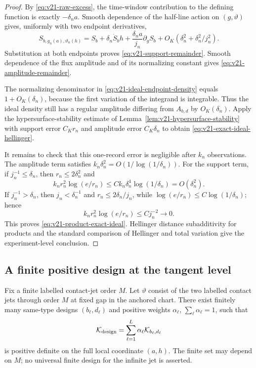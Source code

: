 \begin{proof}
By \eqref{eq:v21-raw-excess}, the time-window contribution to the defining
function is exactly $-\delta_na$.  Smooth dependence of the half-line action
on $(g,\vartheta)$ gives, uniformly with two endpoint derivatives,
\[
 S_{b,g_n(a),\vartheta_n(h)}
 =S_b+\delta_n\dot S_bh
 +\frac{\delta_na}{j_n}\partial_gS_b
 +O_K(\delta_n^2+\delta_n^2/j_n^2).
\]
Substitution at both endpoints proves
\eqref{eq:v21-support-remainder}.  Smooth dependence of the flux amplitude
and of its normalizing constant gives
\eqref{eq:v21-amplitude-remainder}.

The normalizing denominator in \eqref{eq:v21-ideal-endpoint-density} equals
$1+O_K(\delta_n)$, because the first variation of the integrand is integrable.
Thus the ideal density still has a regular amplitude differing from
$A_{b,d}$ by $O_K(\delta_n)$.  Apply the hypersurface-stability estimate
of Lemma~\ref{lem:v21-hypersurface-stability} with support error $C_Kr_n$
and amplitude error $C_K\delta_n$ to obtain
\eqref{eq:v21-exact-ideal-hellinger}.

It remains to check that this one-record error is negligible after
$k_n$ observations.  The amplitude term satisfies
$k_n\delta_n^2=O(1/\log(1/\delta_n))$.  For the support term, if
$j_n^{-1}\le\delta_n$, then $r_n\le2\delta_n^2$ and
\[
 k_nr_n^2\log(e/r_n)
 \le Ck_n\delta_n^4\log(1/\delta_n)=O(\delta_n^2).
\]
If $j_n^{-1}>\delta_n$, then $j_n<\delta_n^{-1}$ and
$r_n\le2\delta_n/j_n$, while
$\log(e/r_n)\le C\log(1/\delta_n)$; hence
\[
 k_nr_n^2\log(e/r_n)\le Cj_n^{-2}\longrightarrow0.
\]
This proves \eqref{eq:v21-product-exact-ideal}.  Hellinger distance
subadditivity for products and the standard comparison of Hellinger and total
variation give the experiment-level conclusion.
\end{proof}

\subsection{A finite positive design at the tangent level}

\begin{lemma}
\label{lem:v21-finite-positive-design}
Fix a finite labelled contact-jet order $M$.  Let $\vartheta$ consist of the
two labelled contact jets through order $M$ at fixed gap in the anchored
chart.  There exist finitely many same-type designs $(b_\ell,d_\ell)$ and
positive weights $\alpha_\ell$, $\sum_\ell\alpha_\ell=1$, such that
\begin{equation}\label{eq:v21-design-information}
 \mathcal K_{\rm design}
 =\sum_{\ell=1}^L\alpha_\ell\mathcal K_{b_\ell,d_\ell}
\end{equation}
is positive definite on the full local coordinate $(a,h)$.  The finite set
may depend on $M$; no universal finite design for the infinite jet is
asserted.
\end{lemma}

